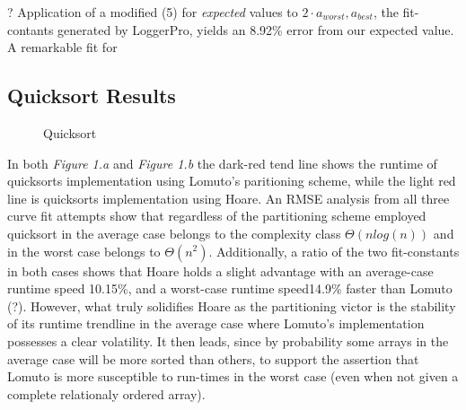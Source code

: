 \documentclass[11pt,letterpaper]{report}
\begin{document}
? Application of a modified (5) for \emph{expected} values to $2 \cdot a_{worst}, a_{best}$, the fit-contants generated by LoggerPro, yields an 8.92\% error from our expected value. A remarkable fit for 

\subsection*{Quicksort Results}
\begin{figure}[h]
  \centering
  \hfill
  \caption{Quicksort}
\end{figure}

In both \emph{Figure 1.a} and \emph{Figure 1.b} the dark-red tend line shows the runtime of quicksorts implementation using Lomuto's paritioning scheme, while the light red line is quicksorts implementation using Hoare. An RMSE analysis from all three curve fit attempts show that regardless of the partitioning scheme employed quicksort in the average case belongs to the complexity class $\Theta (nlog{}(n))$ and in the worst case belongs to $\Theta(n^2)$. Additionally, a ratio of the two fit-constants in both cases shows that Hoare holds a slight advantage with an average-case runtime speed 10.15\%, and a worst-case runtime speed14.9\% faster than Lomuto (?). However, what truly solidifies Hoare as the partitioning victor is the stability of its runtime trendline in the average case where Lomuto's implementation possesses a clear volatility. It then leads, since by probability some arrays in the average case will be more sorted than others, to support the assertion that Lomuto is more susceptible to run-times in the worst case (even when not given a complete relationaly ordered array).
\end{document}
